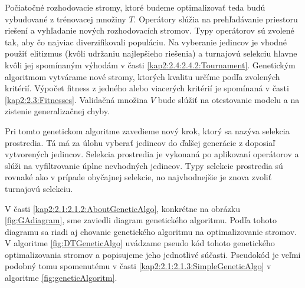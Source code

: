 Počiatočné rozhodovacie stromy, ktoré budeme optimalizovať teda budú vybudované z trénovacej množiny $T$. Operátory slúžia na prehľadávanie priestoru riešení a vyhľadanie nových rozhodovacích stromov. Typy operátorov sú zvolené tak, aby čo najviac diverzifikovali populáciu. Na vyberanie jedincov je vhodné použiť elitizmus (kvôli udržaniu najlepšieho riešenia) a turnajovú selekciu hlavne kvôli jej spomínaným výhodám v časti \ref{kap2:2.4:2.4.2:Tournament}. Genetickým algoritmom vytvárame nové stromy, ktorých kvalitu určíme podľa zvolených kritérií. Výpočet fitness z jedného alebo viacerých kritérií je spomínaná v časti \ref{kap2:2.3:Fitnesses}. Validačná množina $V$ bude slúžiť na otestovanie modelu a na zistenie generalizačnej chyby.

Pri tomto genetickom algoritme zavedieme nový krok, ktorý sa nazýva selekcia prostredia. Tá má za úlohu vyberať jedincov do ďalšej generácie z doposiaľ vytvorených jedincov. Selekcia prostredia je vykonaná po aplikovaní operátorov a slúži na vyfiltrovanie úplne nevhodných jedincov. Typy selekcie prostredia sú rovnaké ako v prípade obyčajnej selekcie, no najvhodnejšie je znova zvoliť turnajovú selekciu.

V časti \ref{kap2:2.1:2.1.2:AboutGeneticAlgo}, konkrétne na obrázku \ref{fig:GAdiagram}, sme zaviedli diagram genetického algoritmu. Podľa tohoto diagramu sa riadi aj chovanie genetického algoritmu na optimalizovanie stromov.
V algoritme \ref{fig:DTGeneticAlgo} uvádzame pseudo kód tohoto genetického optimalizovania stromov a popisujeme jeho jednotlivé súčasti.
Pseudokód je veľmi podobný tomu spomenutému v časti \ref{kap2:2.1:2.1.3:SimpleGeneticAlgo} v algoritme \ref{fig:geneticAlgoritm}.

